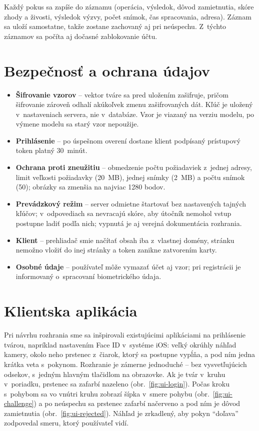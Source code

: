 \documentclass[12pt,a4paper,oneside]{report}
\begin{document}
Každý pokus sa zapíše do záznamu (operácia, výsledok, dôvod zamietnutia, skóre zhody
a živosti, výsledok výzvy, počet snímok, čas spracovania, adresa). Záznam sa uloží
samostatne, takže zostane zachovaný aj pri neúspechu. Z~týchto záznamov sa počíta aj
dočasné zablokovanie účtu.

\section{Bezpečnosť a ochrana údajov}

\begin{itemize}
  \item \textbf{Šifrovanie vzorov} -- vektor tváre sa pred uložením zašifruje, pričom
        šifrovanie zároveň odhalí akúkoľvek zmenu zašifrovaných dát. Kľúč je uložený
        v~nastaveniach servera, nie v~databáze. Vzor je viazaný na verziu modelu, po
        výmene modelu sa starý vzor nepoužije.
  \item \textbf{Prihlásenie} -- po úspešnom overení dostane klient podpísaný prístupový
        token platný 30~minút.
  \item \textbf{Ochrana proti zneužitiu} -- obmedzenie počtu požiadaviek z~jednej adresy,
        limit veľkosti požiadavky (20~MB), jednej snímky (2~MB) a počtu snímok (50);
        obrázky sa zmenšia na najviac 1280 bodov.
  \item \textbf{Prevádzkový režim} -- server odmietne štartovať bez nastavených tajných
        kľúčov; v~odpovediach sa nevracajú skóre, aby útočník nemohol vstup postupne
        ladiť podľa nich; vypnutá je aj verejná dokumentácia rozhrania.
  \item \textbf{Klient} -- prehliadač smie načítať obsah iba z~vlastnej domény, stránku
        nemožno vložiť do inej stránky a token zanikne zatvorením karty.
  \item \textbf{Osobné údaje} -- používateľ môže vymazať účet aj vzor; pri registrácii je
        informovaný o~spracovaní biometrického údaja.
\end{itemize}

\section{Klientska aplikácia}

Pri návrhu rozhrania sme sa inšpirovali existujúcimi aplikáciami na prihlásenie tvárou,
napríklad nastavením Face ID v~systéme iOS: veľký okrúhly náhľad kamery, okolo neho
prstenec z~čiarok, ktorý sa postupne vypĺňa, a pod ním jedna krátka veta s~pokynom.
Rozhranie je zámerne jednoduché -- bez vysvetľujúcich odsekov, s~jedným hlavným
tlačidlom na obrazovke. Ak je tvár v~kruhu v~poriadku, prstenec sa zafarbí nazeleno
(obr.~\ref{fig:ui-login}). Počas kroku s~pohybom sa vo vnútri kruhu zobrazí šípka
v~smere pohybu (obr.~\ref{fig:ui-challenge}) a po neúspechu sa prstenec zafarbí
načerveno a pod ním je dôvod zamietnutia (obr.~\ref{fig:ui-rejected}). Náhľad je
zrkadlený, aby pokyn \enquote{doľava} zodpovedal smeru, ktorý používateľ vidí.
\end{document}
